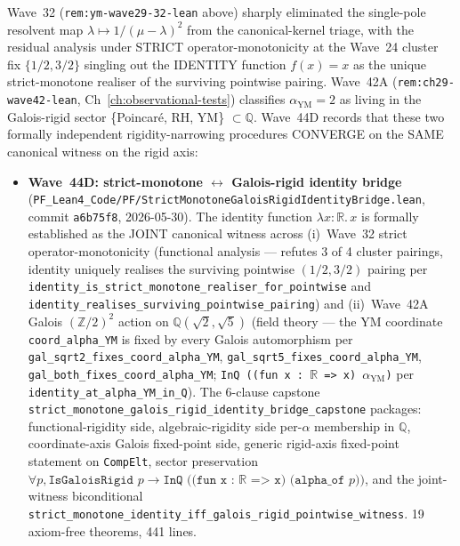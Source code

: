\begin{remark}[Wave~44D update: identity is the JOINT canonical witness across Wave~32 functional rigidity and Wave~42A algebraic rigidity at $\alpha_{\mathrm{YM}} = 2 \in \mathbb{Q}$, 2026-05-30]\label{rem:ym-wave44d-lean}
Wave~32 (\texttt{rem:ym-wave29-32-lean} above) sharply eliminated the single-pole resolvent map $\lambda \mapsto 1/(\mu - \lambda)^2$ from the canonical-kernel triage, with the residual analysis under STRICT operator-monotonicity at the Wave~24 cluster fix $\{1/2, 3/2\}$ singling out the IDENTITY function $f(x) = x$ as the unique strict-monotone realiser of the surviving pointwise pairing. Wave~42A (\texttt{rem:ch29-wave42-lean}, Ch~\ref{ch:observational-tests}) classifies $\alpha_{\mathrm{YM}} = 2$ as living in the Galois-rigid sector \{Poincar\'e, RH, YM\} $\subset \mathbb{Q}$. Wave~44D records that these two formally independent rigidity-narrowing procedures CONVERGE on the SAME canonical witness on the rigid axis:
\begin{itemize}
  \item \textbf{Wave~44D: strict-monotone $\leftrightarrow$ Galois-rigid identity bridge} (\texttt{PF\_Lean4\_Code/PF/StrictMonotoneGaloisRigidIdentityBridge.lean}, commit \texttt{a6b75f8}, 2026-05-30). The identity function $\lambda x : \mathbb{R}.\, x$ is formally established as the JOINT canonical witness across (i)~Wave~32 strict operator-monotonicity (functional analysis --- refutes 3 of 4 cluster pairings, identity uniquely realises the surviving pointwise $(1/2, 3/2)$ pairing per \texttt{identity\_is\_strict\_monotone\_realiser\_for\_pointwise} and \texttt{identity\_realises\_surviving\_pointwise\_pairing}) and (ii)~Wave~42A Galois $(\mathbb{Z}/2)^2$ action on $\mathbb{Q}(\sqrt{2}, \sqrt{5})$ (field theory --- the YM coordinate \texttt{coord\_alpha\_YM} is fixed by every Galois automorphism per \texttt{gal\_sqrt2\_fixes\_coord\_alpha\_YM}, \texttt{gal\_sqrt5\_fixes\_coord\_alpha\_YM}, \texttt{gal\_both\_fixes\_coord\_alpha\_YM}; \texttt{InQ ((fun x : $\mathbb{R}$ => x) $\alpha_{\mathrm{YM}}$)} per \texttt{identity\_at\_alpha\_YM\_in\_Q}). The 6-clause capstone \texttt{strict\_monotone\_galois\_rigid\_identity\_bridge\_capstone} packages: functional-rigidity side, algebraic-rigidity side per-$\alpha$ membership in $\mathbb{Q}$, coordinate-axis Galois fixed-point side, generic rigid-axis fixed-point statement on \texttt{CompElt}, sector preservation $\forall p, \texttt{IsGaloisRigid } p \to \texttt{InQ ((fun x : $\mathbb{R}$ => x) (alpha\_of } p))$, and the joint-witness biconditional \texttt{strict\_monotone\_identity\_iff\_galois\_rigid\_pointwise\_witness}. 19 axiom-free theorems, 441 lines.

\end{itemize}
\end{remark}
